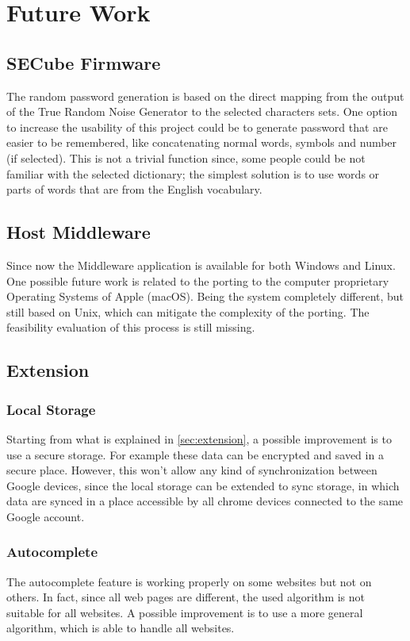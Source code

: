 \section{Future Work}
\label{sec:future_work}


\subsection{SECube Firmware}
The random password generation is based on the direct mapping from the output of the True Random Noise Generator to the selected characters sets. One option to increase the usability of this project could be to generate password that are easier to be remembered, like concatenating normal words, symbols and number (if selected). This is not a trivial function since, some people could be not familiar with the selected dictionary; the simplest solution is to use words or parts of words that are from the English vocabulary.


\subsection{Host Middleware}
Since now the Middleware application is available for both Windows and Linux. One possible future work is related to the porting to the computer proprietary Operating Systems of Apple (macOS). Being the system completely different, but still based on Unix, which can mitigate the complexity of the porting. The feasibility evaluation of this process is still missing.

\subsection{Extension}
\subsubsection{Local Storage}
Starting from what is explained in \autoref{sec:extension}, a possible improvement is to use a secure storage. For example these data can be encrypted and saved in a secure place. However, this won't allow any kind of synchronization between Google devices, since the local storage can be extended to sync storage, in which data are synced in a place accessible by all chrome devices connected to the same Google account.

\subsubsection{Autocomplete}
The autocomplete feature is working properly on some websites but not on others. In fact, since all web pages are different, the used algorithm is not suitable for all websites. A possible improvement is to use a more general algorithm, which is able to handle all websites.

